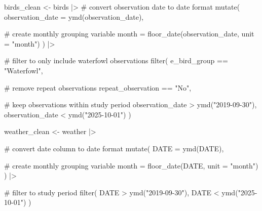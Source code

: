 \documentclass[
  letterpaper,
  DIV=11,
  numbers=noendperiod]{scrartcl}
\newenvironment{Shaded}{\begin{snugshade}}{\end{snugshade}}
\newcommand{\AttributeTok}[1]{\textcolor[rgb]{0.40,0.45,0.13}{#1}}
\newcommand{\CommentTok}[1]{\textcolor[rgb]{0.37,0.37,0.37}{#1}}
\newcommand{\FunctionTok}[1]{\textcolor[rgb]{0.28,0.35,0.67}{#1}}
\newcommand{\NormalTok}[1]{\textcolor[rgb]{0.00,0.23,0.31}{#1}}
\newcommand{\OtherTok}[1]{\textcolor[rgb]{0.00,0.23,0.31}{#1}}
\newcommand{\SpecialCharTok}[1]{\textcolor[rgb]{0.37,0.37,0.37}{#1}}
\newcommand{\StringTok}[1]{\textcolor[rgb]{0.13,0.47,0.30}{#1}}
\begin{document}
\begin{Shaded}
\begin{Highlighting}[]
\NormalTok{birds\_clean }\OtherTok{\textless{}{-}}\NormalTok{ birds }\SpecialCharTok{|\textgreater{}}
  \CommentTok{\# convert observation date to date format}
  \FunctionTok{mutate}\NormalTok{(}
    \AttributeTok{observation\_date =} \FunctionTok{ymd}\NormalTok{(observation\_date),}

    \CommentTok{\# create monthly grouping variable}
    \AttributeTok{month =} \FunctionTok{floor\_date}\NormalTok{(observation\_date,}
                       \AttributeTok{unit =} \StringTok{"month"}\NormalTok{)}
\NormalTok{  ) }\SpecialCharTok{|\textgreater{}}

  \CommentTok{\# filter to only include waterfowl observations}
  \FunctionTok{filter}\NormalTok{(}
\NormalTok{    e\_bird\_group }\SpecialCharTok{==} \StringTok{"Waterfowl"}\NormalTok{,}

    \CommentTok{\# remove repeat observations}
\NormalTok{    repeat\_observation }\SpecialCharTok{==} \StringTok{"No"}\NormalTok{,}

    \CommentTok{\# keep observations within study period}
\NormalTok{    observation\_date }\SpecialCharTok{\textgreater{}} \FunctionTok{ymd}\NormalTok{(}\StringTok{"2019{-}09{-}30"}\NormalTok{),}
\NormalTok{    observation\_date }\SpecialCharTok{\textless{}} \FunctionTok{ymd}\NormalTok{(}\StringTok{"2025{-}10{-}01"}\NormalTok{)}
\NormalTok{  )}
\end{Highlighting}
\end{Shaded}

\begin{Shaded}
\begin{Highlighting}[]
\NormalTok{weather\_clean }\OtherTok{\textless{}{-}}\NormalTok{ weather }\SpecialCharTok{|\textgreater{}} 
  
  \CommentTok{\# convert date column to date format}
  \FunctionTok{mutate}\NormalTok{(}
    \AttributeTok{DATE =} \FunctionTok{ymd}\NormalTok{(DATE),}
    
    \CommentTok{\# create monthly grouping variable}
    \AttributeTok{month =} \FunctionTok{floor\_date}\NormalTok{(DATE,}
                       \AttributeTok{unit =} \StringTok{"month"}\NormalTok{)}
\NormalTok{  ) }\SpecialCharTok{|\textgreater{}} 
  
  \CommentTok{\# filter to study period}
  \FunctionTok{filter}\NormalTok{(}
\NormalTok{    DATE }\SpecialCharTok{\textgreater{}} \FunctionTok{ymd}\NormalTok{(}\StringTok{"2019{-}09{-}30"}\NormalTok{),}
\NormalTok{    DATE }\SpecialCharTok{\textless{}} \FunctionTok{ymd}\NormalTok{(}\StringTok{"2025{-}10{-}01"}\NormalTok{)}
\NormalTok{  )}
\end{Highlighting}
\end{Shaded}
\end{document}
